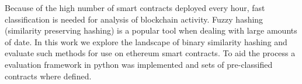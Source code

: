 \documentclass[../main.tex]{subfiles}
\begin{document}
Because of the high number of smart contracts deployed every hour, fast classification is needed for analysis of blockchain activity.
Fuzzy hashing (similarity preserving hashing) is a popular tool when dealing with large amounts of date.
In this work we explore the landscape of binary similarity hashing and evaluate such methods for use on ethereum smart contracts.
To aid the process a evaluation framework in python was implemented and sets of pre-classified contracts where defined.
\end{document}
